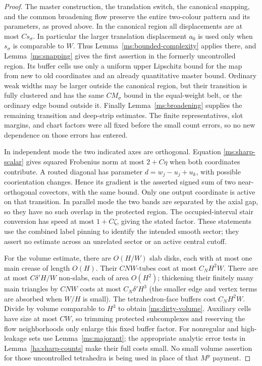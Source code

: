 \documentclass[11pt]{article}
\numberwithin{equation}{section}
\theoremstyle{definition}
\theoremstyle{remark}
\begin{document}
\begin{proof}
The master construction, the translation switch, the canonical
snapping, and the common broadening flow preserve the entire
two-colour pattern and its parameters, as proved above.  In the
canonical region all displacements are at most $Cs_\sigma$.
In particular the larger translation displacement $a_0$ is used
only when $s_\sigma$ is comparable to $W$.  Thus
Lemma~\ref{ms:bounded-complexity} applies there, and
Lemma~\ref{ms:snapping} gives the first assertion in the formerly
uncontrolled region.  Its buffer cells use only a uniform upper
Lipschitz bound for the map from new to old coordinates and an
already quantitative master bound.  Ordinary weak widths may
be larger outside the canonical region, but their transition is
fully clustered and has the same $CM_\sigma$ bound in the
equal-weight belt, or the ordinary edge bound outside it.
Finally Lemma~\ref{ms:broadening} supplies the remaining transition and
deep-strip estimates.  The finite representatives, slot margins,
and chart factors were all fixed before the small count errors,
so no new dependence on those errors has entered.

In independent mode the two indicated axes are orthogonal.
Equation \eqref{ms:sharp-scalar} gives squared Frobenius norm at
most $2+C\eta$ when both coordinates contribute.  A routed
diagonal has parameter $d=w_j-u_j+u_k$, with possible
coorientation changes.  Hence its gradient is the asserted
signed sum of two near-orthogonal covectors, with the same bound.
Only one output coordinate is active on that transition.  In
parallel mode the two bands are separated by the axial gap, so
they have no such overlap in the protected region.  The
occupied-interval stair conversion has speed at most
$1+C\zeta$, giving the stated factor.  These statements use the
combined label pinning to identify the intended smooth sector;
they assert no estimate across an unrelated sector or an active
central cutoff.

For the volume estimate, there are $O(H/W)$ slab disks, each
with at most one main crease of length $O(H)$.  Their
$CNW$-tubes cost at most $C_NH^2W$.  There are at most
$C\delta'H/W$ non-slabs, each of area $O(H^2)$; thickening
their finitely many main triangles by $CNW$ costs at most
$C_N\delta'H^3$ (the smaller edge and vertex terms are absorbed
when $W/H$ is small).  The tetrahedron-face buffers cost
$C_NH^2W$.  Divide by volume comparable to $H^3$ to obtain
\eqref{ms:dirty-volume}.  Auxiliary cells have size at most
$CW$, so trimming protected subcomplexes and reserving the
flow neighborhoods only enlarge this fixed buffer factor.
For nonregular and high-leakage sets use
Lemma~\ref{ms:majorant}; the appropriate analytic error tests in
Lemma~\ref{ha:sharp-counts} make their full costs small.  No small
volume assertion for those uncontrolled tetrahedra is being
used in place of that $M^p$ payment.
\end{proof}
\end{document}
